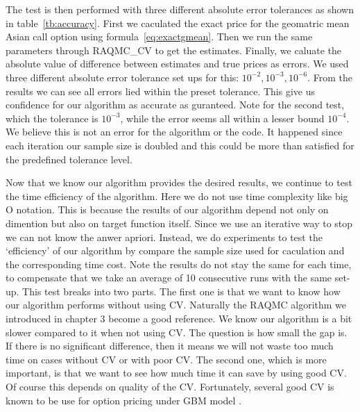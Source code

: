 The test is then performed with three different absolute error tolerances as shown in table~\ref{tb:accuracy}.
First we caculated the exact price for the geomatric mean Asian call option using formula~\eqref{eq:exactgmean}. 
Then we run the same parameters through RAQMC\_CV to get the estimates. 
Finally, we caluate the absolute value of difference between estimates and true prices as errors. 
We used three different absolute error tolerance set ups for this: $10^{-2}, 10^{-3}, 10^{-6}$.   
From the results we can see all errors lied within the preset tolerance. 
This give us confidence for our algorithm as accurate as guranteed. 
Note for the second test, which the tolerance is $10^{-3}$, while the error seems all within a lesser bound $10^{-4}$. 
We believe this is not an error for the algorithm or the code.  
It happened since each iteration our sample size is doubled and this could be more than satisfied for the predefined tolerance level.


Now that we know our algorithm provides the desired results, we continue to test the time efficiency of the algorithm. 
Here we do not use time complexity like big O notation. This is because the results of our algorithm depend not only on dimention but also on target function itself. Since we use an iterative way to stop we can not know the anwer apriori. 
Instead, we do experiments to test the `efficiency' of our algorithm by compare the sample size used for caculation and the corresponding time cost. 
Note the results do not stay the same for each time, to compensate that we take an average of 10 consecutive runs with the same set-up. 
This test breaks into two parts. 
The first one is that we want to know how our algorithm performs without using CV. 
Naturally the RAQMC algorithm we introduced in chapter 3 become a good reference. 
We know our algorithm is a bit slower compared to it when not using CV. The question is how small the gap is. 
If there is no significant difference, then it means we will not waste too much time on cases without CV or with poor CV. 
The second one, which is more important, is that we want to see how much time it can save by using good CV. Of course this depends on quality of the CV. Fortunately, several good CV is known to be use for option pricing under GBM model \cite{lidebrandt2007variance}.         

